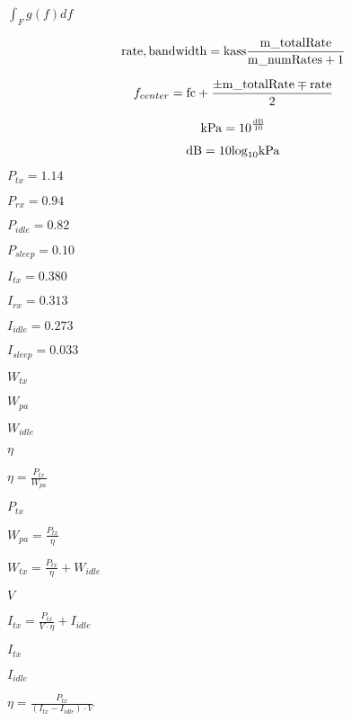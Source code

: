 \documentclass{article}
\begin{document}
$\int_F g(f) df $
\pagebreak

\[{\rm{rate, bandwidth}} = {\rm{kass}}\frac{{{\rm{m\_totalRate}}}}{{{\rm{m\_numRates}} + 1}}\]
\pagebreak

\[{f_{center}} = {\rm{fc}} + \frac{{ \pm {\rm{m\_totalRate}} \mp {\rm{rate}}}}{2}\]
\pagebreak

\[{\rm{kPa}} = {10^{\frac{{{\rm{dB}}}}{{10}}}}\]
\pagebreak

\[{\rm{dB}} = 10{\log _{10}}{\rm{kPa}}\]
\pagebreak

$ P_{tx} = 1.14 $
\pagebreak

$ P_{rx} = 0.94 $
\pagebreak

$ P_{idle} = 0.82 $
\pagebreak

$ P_{sleep} = 0.10 $
\pagebreak

$ I_{tx} = 0.380 $
\pagebreak

$ I_{rx} = 0.313 $
\pagebreak

$ I_{idle} = 0.273 $
\pagebreak

$ I_{sleep} = 0.033 $
\pagebreak

$ W_{tx} $
\pagebreak

$ W_{pa} $
\pagebreak

$ W_{idle} $
\pagebreak

$ \eta $
\pagebreak

$ \eta = \frac{P_{tx}}{W_{pa}} $
\pagebreak

$ P_{tx} $
\pagebreak

$ W_{pa} = \frac{P_{tx}}{\eta} $
\pagebreak

$ W_{tx} = \frac{P_{tx}}{\eta} + W_{idle} $
\pagebreak

$ V $
\pagebreak

$ I_{tx} = \frac{P_{tx}}{V \cdot \eta} + I_{idle} $
\pagebreak

$ I_{tx} $
\pagebreak

$ I_{idle} $
\pagebreak

$ \eta = \frac{P_{tx}}{(I_{tx}-I_{idle})\cdot V} $
\pagebreak
\end{document}
